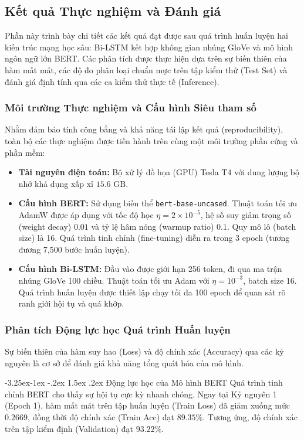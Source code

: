 \documentclass[a4paper]{article}
\makeatletter
\theoremstyle{definition}
\newcounter {subsubsubsection}[subsubsection]
\newcommand\subsubsubsection{\@startsection{subsubsubsection}{4}{\z@}%
                                     {-3.25ex\@plus -1ex \@minus -.2ex}%
                                     {1.5ex \@plus .2ex}%
                                     {\normalfont\normalsize\bfseries}}
\makeatother
\begin{document}
\subsection{Kết quả Thực nghiệm và Đánh giá}

Phần này trình bày chi tiết các kết quả đạt được sau quá trình huấn luyện hai kiến trúc mạng học sâu: Bi-LSTM kết hợp không gian nhúng GloVe và mô hình ngôn ngữ lớn BERT. Các phân tích được thực hiện dựa trên sự biến thiên của hàm mất mát, các độ đo phân loại chuẩn mực trên tập kiểm thử (Test Set) và đánh giá định tính qua các ca kiểm thử thực tế (Inference).

\subsubsection{Môi trường Thực nghiệm và Cấu hình Siêu tham số}
Nhằm đảm bảo tính công bằng và khả năng tái lập kết quả (reproducibility), toàn bộ các thực nghiệm được tiến hành trên cùng một môi trường phần cứng và phần mềm:
\begin{itemize}
	\item \textbf{Tài nguyên điện toán:} Bộ xử lý đồ họa (GPU) Tesla T4 với dung lượng bộ nhớ khả dụng xấp xỉ $15.6\text{ GB}$.
	\item \textbf{Cấu hình BERT:} Sử dụng biến thể \texttt{bert-base-uncased}. Thuật toán tối ưu AdamW được áp dụng với tốc độ học $\eta = 2 \times 10^{-5}$, hệ số suy giảm trọng số (weight decay) $0.01$ và tỷ lệ hâm nóng (warmup ratio) $0.1$. Quy mô lô (batch size) là 16. Quá trình tinh chỉnh (fine-tuning) diễn ra trong 3 epoch (tương đương 7,500 bước huấn luyện).
	\item \textbf{Cấu hình Bi-LSTM:} Đầu vào được giới hạn 256 token, đi qua ma trận nhúng GloVe 100 chiều. Thuật toán tối ưu Adam với $\eta = 10^{-3}$, batch size 16. Quá trình huấn luyện được thiết lập chạy tối đa 100 epoch để quan sát rõ ranh giới hội tụ và quá khớp.
\end{itemize}

\subsubsection{Phân tích Động lực học Quá trình Huấn luyện}
Sự biến thiên của hàm suy hao (Loss) và độ chính xác (Accuracy) qua các kỷ nguyên là cơ sở để đánh giá khả năng tổng quát hóa của mô hình.

\subsubsubsection{Động lực học của Mô hình BERT}
Quá trình tinh chỉnh BERT cho thấy sự hội tụ cực kỳ nhanh chóng. Ngay tại Kỷ nguyên 1 (Epoch 1), hàm mất mát trên tập huấn luyện (Train Loss) đã giảm xuống mức $0.2669$, đồng thời độ chính xác (Train Acc) đạt $89.35\%$. Tương ứng, độ chính xác trên tập kiểm định (Validation) đạt $93.22\%$.
\end{document}
